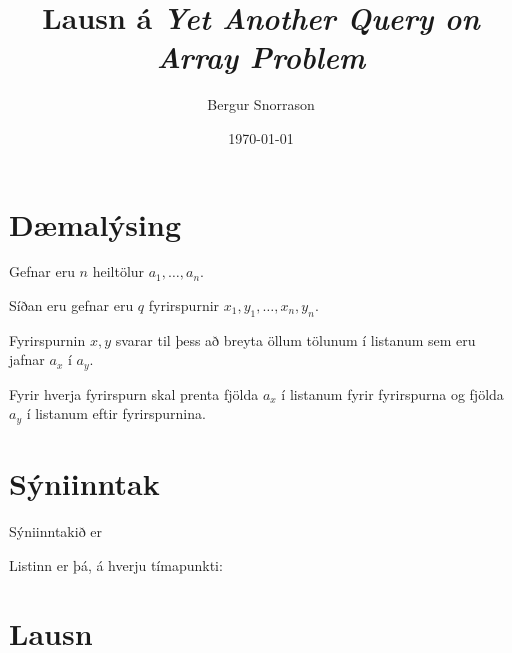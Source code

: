 \title{Lausn á \emph{Yet Another Query on Array Problem}}
\author{Bergur Snorrason}
\date{\today}



\frame{\titlepage}

\section{Dæmalýsing}
{
	{
		\item<1-> Gefnar eru $n$ heiltölur $a_1, \dots, a_n$.
		\item<2-> Síðan eru gefnar eru $q$ fyrirspurnir $x_1, y_1, \dots, x_n, y_n$.
		\item<3-> Fyrirspurnin $x, y$ svarar til þess að breyta öllum tölunum í listanum sem eru jafnar $a_x$ í $a_y$.
		\item<4-> Fyrir hverja fyrirspurn skal prenta fjölda $a_x$ í listanum fyrir fyrirspurna og fjölda $a_y$ í listanum eftir fyrirspurnina.
	}
}

\section{Sýniinntak}
{
	{
		\item<1-> Sýniinntakið er
		\item<2->[] 
		\item<3-> Listinn er þá, á hverju tímapunkti:
		\item<4->[] 
		\item<5->[] 
		\item<6->[] 
		\item<7->[] 
		\item<8->[] 
	}
}

\section{Lausn}
